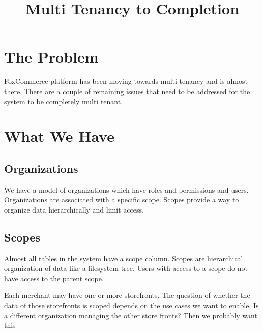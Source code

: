 \documentclass[11pt]{article}
\title{Multi Tenancy to Completion}
\begin{document}
\maketitle
\section{The Problem}

FoxCommerce platform has been moving towards multi-tenancy and is almost there. 
There are a couple of remaining issues that need to be addressed for the system 
to be completely multi tenant. 

\section{What We Have}

\subsection{Organizations}

We have a model of organizations which have roles and permissions and users.
Organizations are associated with a specific scope. Scopes provide a way to
organize data hierarchically and limit access.

\subsection{Scopes}

Almost all tables in the system have a scope column. Scopes are hierarchical 
organization of data like a filesystem tree. Users with access to a scope do not
have access to the parent scope.


Each merchant may have one or more storefronts. The question of whether the
data of those storefronts is scoped depends on the use cases we want to enable.
Is a different organization managing the other store fronts? Then we probably want this
\end{document}
